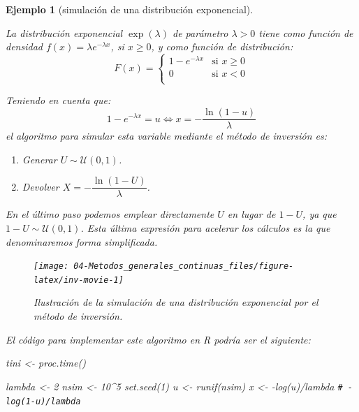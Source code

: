 \documentclass[
  10pt,
]{book}
\newenvironment{Shaded}{\begin{snugshade}}{\end{snugshade}}
\newcommand{\CommentTok}[1]{\textcolor[rgb]{0.56,0.35,0.01}{\textit{#1}}}
\newcommand{\DecValTok}[1]{\textcolor[rgb]{0.00,0.00,0.81}{#1}}
\newcommand{\FunctionTok}[1]{\textcolor[rgb]{0.00,0.00,0.00}{#1}}
\newcommand{\NormalTok}[1]{#1}
\newcommand{\OtherTok}[1]{\textcolor[rgb]{0.56,0.35,0.01}{#1}}
\newcommand{\SpecialCharTok}[1]{\textcolor[rgb]{0.00,0.00,0.00}{#1}}
\theoremstyle{break}
\newtheorem{example}{Ejemplo}[chapter]
\theoremstyle{nonumberplain}
\renewcommand{\CommentTok}[1]{\textcolor[rgb]{0.41,0.41,0.41}{\texttt{#1}}}
\begin{document}
\begin{example}[simulación de una distribución exponencial]
\protect\hypertarget{exm:exp-inv}{}\label{exm:exp-inv}

La distribución exponencial \(\exp \left( \lambda \right)\) de parámetro \(\lambda>0\)
tiene como función de densidad \(f(x) =\lambda e^{-\lambda x}\), si \(x\geq 0\),
y como función de distribución:
\[F(x)=\left\{ \begin{array}{ll}
1-e^{-\lambda x} & \text{si } x \ge 0 \\
0 & \text{si } x < 0\\
\end{array} \right.\]

Teniendo en cuenta que:
\[1-e^{-\lambda x}=u \Leftrightarrow x=-\frac{\ln \left( 1-u\right) }{ \lambda }\]
el algoritmo para simular esta variable mediante el método de inversión es:

\begin{enumerate}
\def\labelenumi{\arabic{enumi}.}
\item
  Generar \(U \sim \mathcal{U}(0, 1)\).
\item
  Devolver \(X=-\dfrac{\ln \left( 1-U\right) }{\lambda }\).
\end{enumerate}

En el último paso podemos emplear directamente \(U\) en lugar de \(1-U\), ya que \(1 - U \sim \mathcal{U}(0, 1)\).
Esta última expresión para acelerar los cálculos es la que denominaremos \emph{forma simplificada}.

\begin{figure}[!htbp]

{\centering \texttt{[image: 04-Metodos\_generales\_continuas\_files/figure-latex/inv-movie-1]} 

}

\caption{Ilustración de la simulación de una distribución exponencial por el método de inversión.}\label{fig:inv-movie}
\end{figure}

El código para implementar este algoritmo en R podría ser el siguiente:

\begin{Shaded}
\begin{Highlighting}[]
\NormalTok{tini }\OtherTok{\textless{}{-}} \FunctionTok{proc.time}\NormalTok{()}

\NormalTok{lambda }\OtherTok{\textless{}{-}} \DecValTok{2}
\NormalTok{nsim }\OtherTok{\textless{}{-}} \DecValTok{10}\SpecialCharTok{\^{}}\DecValTok{5}
\FunctionTok{set.seed}\NormalTok{(}\DecValTok{1}\NormalTok{)}
\NormalTok{u }\OtherTok{\textless{}{-}} \FunctionTok{runif}\NormalTok{(nsim)}
\NormalTok{x }\OtherTok{\textless{}{-}} \SpecialCharTok{{-}}\FunctionTok{log}\NormalTok{(u)}\SpecialCharTok{/}\NormalTok{lambda }\CommentTok{\# {-}log(1{-}u)/lambda}


\end{Highlighting}
\end{Shaded}
\end{example}
\end{document}
